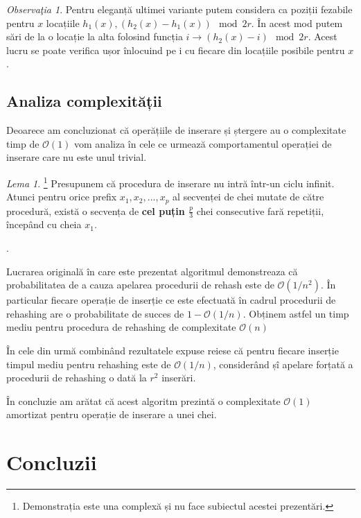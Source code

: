 \documentclass[a4paper]{article}
\theoremstyle{remark}
\newtheorem{remark}{Observa\c{t}ia}
\newtheorem{lemma}[theorem]{Lema}
\theoremstyle{definition}
\begin{document}
\begin{remark}
Pentru eleganță ultimei variante putem considera ca poziții fezabile pentru $x$ locațiile $h_1(x), (h_2(x) - h_1(x)) \mod 2r$. În acest mod putem sări de la o locație la alta folosind funcția $i \to (h_2(x) - i) \mod 2r$. Acest lucru se poate verifica ușor înlocuind pe i cu fiecare din locațiile posibile pentru $x$.
\end{remark}

\subsection{Analiza complexității}

Deoarece am concluzionat că operățiile de inserare și ștergere au o complexitate timp de $\mathcal{O}(1)$ vom analiza în cele ce urmează comportamentul operației de inserare care nu este unul trivial.

\begin{lemma}
\footnote{Demonstrația este una complexă și nu face subiectul acestei prezentări.}
Presupunem că procedura de inserare nu intră într-un ciclu infinit. Atunci pentru orice prefix $x_1, x_2, ..., x_p$ al secvenței de chei mutate de către procedură, există o secvența de \textbf{cel puțin $\frac{p}{3}$} chei consecutive fară repetiții, începând cu cheia $x_1$.
\end{lemma}.

Lucrarea originală în care este prezentat algoritmul demonstreaza că probabilitatea de a cauza apelarea procedurii de rehash este de $\mathcal{O}(1/n^2)$. În particular fiecare operație de inserție ce este efectuată în cadrul procedurii de rehashing are o probabilitate de succes de $1 - \mathcal{O}(1/n)$. Obținem astfel un timp mediu pentru procedura de rehashing de complexitate $\mathcal{O}(n)$ 

În cele din urmă combinând rezultatele expuse reiese că pentru fiecare inserție timpul mediu pentru rehashing este de $\mathcal{O}(1/n)$, considerând șî apelare forțată a procedurii de rehashing o dată la $r^2$ inserări.

În concluzie am arătat că acest algoritm prezintă o complexitate $\mathcal{O}(1)$ amortizat pentru operație de inserare a unei chei.

\newpage

\section {Concluzii}
\end{document}
